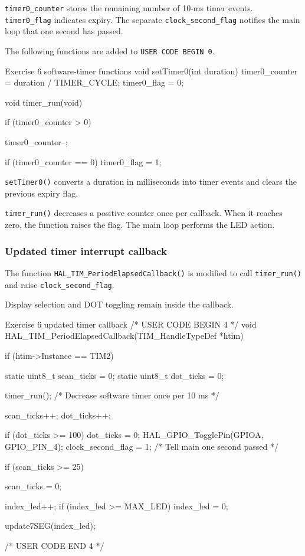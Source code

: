 \documentclass[a4paper]{article}
\begin{document}
\texttt{timer0\_counter} stores the remaining
number of 10-ms timer events.
\texttt{timer0\_flag} indicates expiry.
The separate \texttt{clock\_second\_flag}
notifies the main loop that one second has passed.

The following functions are added to
\texttt{USER CODE BEGIN 0}.

\begin{stmcode}{Exercise 6 software-timer functions}
void setTimer0(int duration)
{
    timer0_counter = duration / TIMER_CYCLE;
    timer0_flag = 0;
}

void timer_run(void)
{
    if (timer0_counter > 0)
    {
        timer0_counter--;

        if (timer0_counter == 0)
        {
            timer0_flag = 1;
        }
    }
}
\end{stmcode}

\texttt{setTimer0()} converts a duration in
milliseconds into timer events and clears the
previous expiry flag.

\texttt{timer\_run()} decreases a positive
counter once per callback. When it reaches
zero, the function raises the flag.
The main loop performs the LED action.

\subsubsection{Updated timer interrupt callback}

The function
\texttt{HAL\_TIM\_PeriodElapsedCallback()}
is modified to call \texttt{timer\_run()}
and raise \texttt{clock\_second\_flag}.

Display selection and DOT toggling remain
inside the callback.

\begin{stmcode}{Exercise 6 updated timer callback}
/* USER CODE BEGIN 4 */
void HAL_TIM_PeriodElapsedCallback(TIM_HandleTypeDef *htim)
{
    if (htim->Instance == TIM2)
    {
        static uint8_t scan_ticks = 0;
        static uint8_t dot_ticks = 0;

        timer_run();    /* Decrease software timer once per 10 ms */

        scan_ticks++;
        dot_ticks++;

        if (dot_ticks >= 100)
        {
            dot_ticks = 0;
            HAL_GPIO_TogglePin(GPIOA, GPIO_PIN_4);
            clock_second_flag = 1; /* Tell main one second passed */
        }

        if (scan_ticks >= 25)
        {
            scan_ticks = 0;

            index_led++;
            if (index_led >= MAX_LED)
            {
                index_led = 0;
            }

            update7SEG(index_led);
        }
    }
}
/* USER CODE END 4 */
\end{stmcode}
\end{document}

